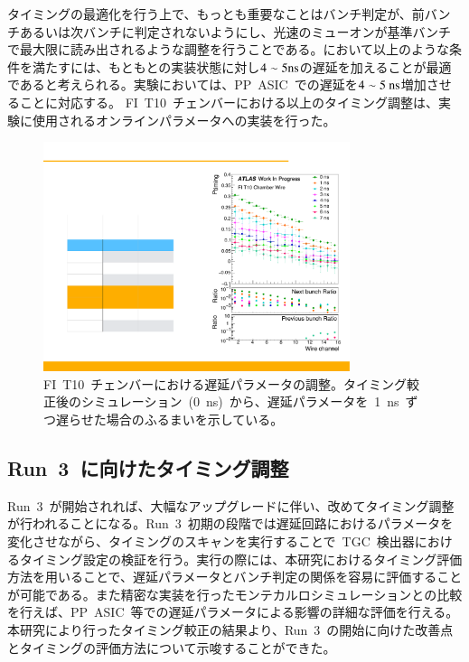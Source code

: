タイミングの最適化を行う上で、もっとも重要なことはバンチ判定が、前バンチあるいは次バンチに判定されないようにし、光速のミューオンが基準バンチで最大限に読み出されるような調整を行うことである。において以上のような条件を満たすには、もともとの実装状態に対し$4\sim5\rm{ns}$の遅延を加えることが最適であると考えられる。実験においては、PP~ASIC~での遅延を$4\sim5~\rm{ns}$増加させることに対応する。
FI~T10~チェンバーにおける以上のタイミング調整は、実験に使用されるオンラインパラメータへの実装を行った。
\begin{figure}[tbp]
    \centering   
    \includegraphics[width=0.8\textwidth,page=1]{img/plot/FItune.pdf}
    \caption[FI T10 チェンバーにおける遅延パラメータの調整]{FI~T10~チェンバーにおける遅延パラメータの調整。タイミング較正後のシミュレーション~(0~ns)~から、遅延パラメータを~1~ns~ずつ遅らせた場合のふるまいを示している。}
    \label{fig:fitune}
\end{figure}

\subsection{Run~3~に向けたタイミング調整}
Run~3~が開始されれば、大幅なアップグレードに伴い、改めてタイミング調整が行われることになる。Run~3~初期の段階では遅延回路におけるパラメータを変化させながら、タイミングのスキャンを実行することで~TGC~検出器におけるタイミング設定の検証を行う。実行の際には、本研究におけるタイミング評価方法を用いることで、遅延パラメータとバンチ判定の関係を容易に評価することが可能である。また精密な実装を行ったモンテカルロシミュレーションとの比較を行えば、PP~ASIC~等での遅延パラメータによる影響の詳細な評価を行える。
本研究により行ったタイミング較正の結果より、Run~3~の開始に向けた改善点とタイミングの評価方法について示唆することができた。
